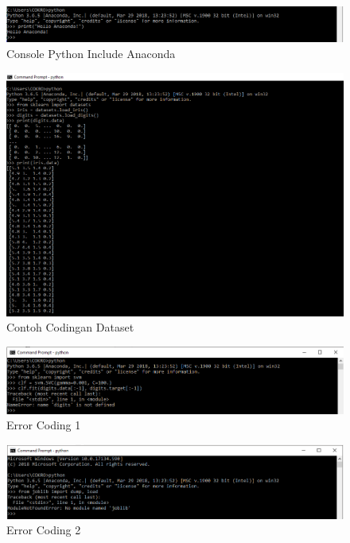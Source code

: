 \begin{figure}[ht]
      \centerline{\includegraphics[width=1\textwidth]
      {figures/c3}}
      \caption{Console Python Include Anaconda}
      \label{c3}
      \end{figure}

\begin{figure}[ht]
      \centerline{\includegraphics[width=1\textwidth]
      {figures/c4}}
      \caption{Contoh Codingan Dataset}
      \label{c4}
      \end{figure}

\begin{figure}[ht]
      \centerline{\includegraphics[width=1\textwidth]
      {figures/c5}}
      \caption{Error Coding 1}
      \label{c5}
      \end{figure}

\begin{figure}[ht]
      \centerline{\includegraphics[width=1\textwidth]
      {figures/c6}}
      \caption{Error Coding 2}
      \label{c6}
      \end{figure}

